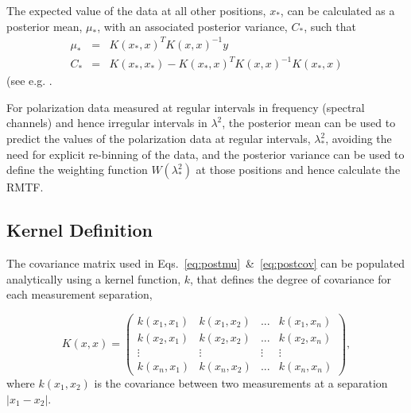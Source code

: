 \documentclass[fleqn,usenatbib]{mnras}
\begin{document}
The expected value of the data at all other positions, $x_{\ast}$, can be calculated as a posterior mean, $\mu_{\ast}$, with an associated posterior variance, $C_{\ast}$, such that
%
\begin{eqnarray}
\label{eq:postmu} \mu_{\ast} &=&  K(x_{\ast},x)^T K(x,x)^{-1} y  \\
\label{eq:postcov} C_{\ast} &=&  K(x_{\ast},x_{\ast}) - K(x_{\ast},x)^T K(x,x)^{-1} K(x_{\ast},x)
\end{eqnarray}
%
(see e.g. \cite{3569, article}.

For polarization data measured at regular intervals in frequency (spectral channels) and hence irregular intervals in $\lambda^2$, the posterior mean can be used to predict the values of the polarization data at regular intervals, $\lambda_{\ast}^2$, avoiding the need for explicit re-binning of the data, and the posterior variance can be used to define the weighting function $W(\lambda_{\ast}^2)$ at those positions and hence calculate the RMTF.

\subsection{Kernel Definition}
\label{sec:kernels}

The covariance matrix used in Eqs.~\ref{eq:postmu}~\&~\ref{eq:postcov} can be populated analytically using a kernel function, $k$, that defines the degree of covariance for each measurement separation,

\begin{equation}
K(x,x) = \left(
\begin{array}{cccc}
k(x_1,x_1) & k(x_1,x_2) & ... & k(x_1,x_n) \\
k(x_2,x_1) & k(x_2,x_2) & ... & k(x_2,x_n) \\
\vdots & \vdots & \vdots & \vdots \\
k(x_n,x_1) & k(x_n,x_2) & ... & k(x_n,x_n)
\end{array}
\right),
\end{equation}
%
where $k(x_1,x_2)$ is the covariance between two measurements at a separation $|x_1 - x_2|$.

%
%
\end{document}
